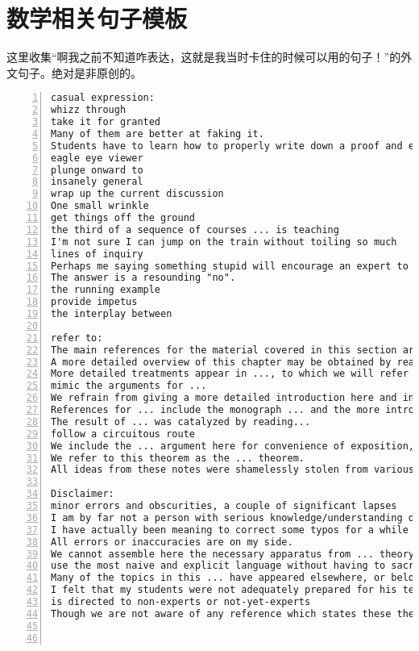 \documentclass[11pt]{amsart}
\begin{document}
\section{数学相关句子模板}
这里收集“啊我之前不知道咋表达，这就是我当时卡住的时候可以用的句子！”的外文句子。绝对是非原创的。
\begin{lstlisting}[numbers=left,numberstyle=\tiny,numbersep=10pt]
casual expression:
whizz through
take it for granted
Many of them are better at faking it.
Students have to learn how to properly write down a proof and everything. So one has to do important pedagogical work and teach them, how to do this.
eagle eye viewer
plunge onward to
insanely general
wrap up the current discussion
One small wrinkle
get things off the ground
the third of a sequence of courses ... is teaching
I'm not sure I can jump on the train without toiling so much
lines of inquiry
Perhaps me saying something stupid will encourage an expert to weigh in
The answer is a resounding "no".
the running example
provide impetus
the interplay between

refer to:
The main references for the material covered in this section are ...
A more detailed overview of this chapter may be obtained by reading the introductions to the various sections.
More detailed treatments appear in ..., to which we will refer for proofs.
mimic the arguments for ...
We refrain from giving a more detailed introduction here and instead refer the reader to the table of contents as well as to the short introductions of the individual sections.
References for ... include the monograph ... and the more introductory account ...
The result of ... was catalyzed by reading...
follow a circuitous route
We include the ... argument here for convenience of exposition, and because the comparison with their constructions is interesting in its own right.
We refer to this theorem as the ... theorem.
All ideas from these notes were shamelessly stolen from various lecture notes in the literature. I mention a few:

Disclaimer:
minor errors and obscurities, a couple of significant lapses
I am by far not a person with serious knowledge/understanding of ..., thus in the ... I may oversimplify/overcomplicate things, be inaccurate, or even wrong, and miss subtelties.
I have actually been meaning to correct some typos for a while and so I will hopefully do all these corrections in the next few weeks.
All errors or inaccuracies are on my side.
We cannot assemble here the necessary apparatus from ... theory.
use the most naive and explicit language without having to sacrifice any essential ideas
Many of the topics in this ... have appeared elsewhere, or belong to the mathematical folklore; it should not be assumed that uncredited results are due to the author.
I felt that my students were not adequately prepared for his text, and I wrote my notes with the hope to provide this preparation.
is directed to non-experts or not-yet-experts
Though we are not aware of any reference which states these theorems in the generality which we consider, these theorems should be considered well known.



\end{lstlisting}
\end{document}
